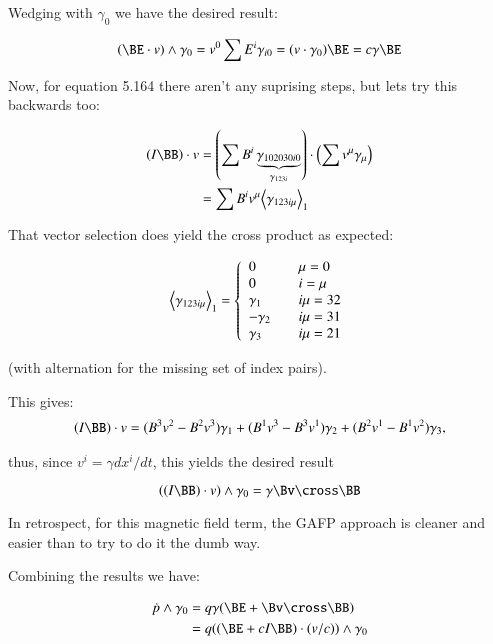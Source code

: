 \documentclass{article}
\newcommand{\gpgrade}[2] {{\left\langle{{#1}}\right\rangle}_{#2}}
\newcommand{\gpgradeone}[1] {\gpgrade{#1}{1}}
\begin{document}
Wedging with $\gamma_0$ we have the desired result:

\begin{equation*}
(\BE \cdot v) \wedge \gamma_0 = v^0 \sum E^i \gamma_{i0} = (v \cdot \gamma_0) \BE = c \gamma \BE
\end{equation*}

Now, for equation 5.164 there aren't any suprising steps, but lets try this backwards too:

\begin{align*}
(I \BB) \cdot v
&= \left(\sum B^i \underbrace{\gamma_{102030i0}}_{\gamma_{123i}} \right) \cdot \left( \sum v^{\mu} \gamma_{\mu} \right) \\
&= \sum B^i v^{\mu} \gpgradeone{\gamma_{123i\mu}}
\end{align*}

That vector selection does yield the cross product as expected:

\begin{equation*}
\gpgradeone{\gamma_{123i\mu}} =
\left\{
\begin{array}{l l}
0 & \quad \mu = 0 \\
0 & \quad i = \mu \\
\gamma_1 & \quad i\mu = 32 \\
-\gamma_2 & \quad i\mu = 31 \\
\gamma_3 & \quad i\mu = 21 \\
\end{array} \right.
\end{equation*}

(with alternation for the missing set of index pairs).

This gives:
\begin{align*}
(I \BB) \cdot v
= (B^3 v^2 - B^2 v^3) \gamma_1
+ (B^1 v^3 - B^3 v^1) \gamma_2
+ (B^2 v^1 - B^1 v^2) \gamma_3,
\end{align*}

thus, since $v^i = \gamma d{x^i}/dt$, this yields the desired result

\begin{equation*}
((I\BB) \cdot v) \wedge \gamma_0 = \gamma \Bv \cross \BB
\end{equation*}

In retrospect, for this magnetic field term, the GAFP approach is cleaner and easier than to try to do it the dumb way.

Combining the results we have:

\begin{align*}
\dot{p} \wedge \gamma_0
&= q \gamma ( \BE + \Bv \cross \BB ) \\
&= q (( \BE + c I \BB ) \cdot (v/c)) \wedge \gamma_0 \\
\end{align*}
\end{document}
